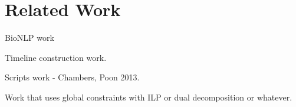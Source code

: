 \section{Related Work}

BioNLP work

Timeline construction work.

Scripts work - Chambers, Poon 2013.

Work that uses global constraints with ILP or dual decomposition or whatever.

 
